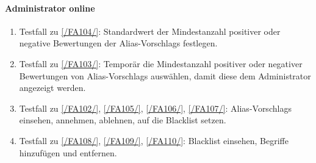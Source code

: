 \paragraph{\Gls{Administrator} online}
\begin{enumerate}[label=\textbf{/T\arabic*0/}, align=left, resume]
	\item \label{/T260/} Testfall zu \ref{/FA104/}: Standardwert der Mindestanzahl positiver oder negative Bewertungen der \Glspl{Alias-Vorschlag} festlegen.
	\item \label{/T270/} Testfall zu \ref{/FA103/}: Temporär die Mindestanzahl positiver oder negativer Bewertungen von \Glspl{Alias-Vorschlag} auswählen, damit diese dem \Gls{Administrator} angezeigt werden.
	\item \label{/T280/} Testfall zu \ref{/FA102/}, \ref{/FA105/}, \ref{/FA106/}, \ref{/FA107/}: \Glspl{Alias-Vorschlag} einsehen, annehmen, ablehnen, auf die \Gls{Blacklist} setzen.
	\item \label{/T290/} Testfall zu \ref{/FA108/}, \ref{/FA109/}, \ref{/FA110/}: \Gls{Blacklist} einsehen, Begriffe hinzufügen und entfernen.
\end{enumerate}
